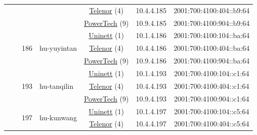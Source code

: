 \begin{small}
\begin{center}
\begin{longtable}{|c|c|c|c|c|c|c|c|}
  &  &  &  & \multicolumn{2}{|c|}{\tiny{\href{https://www.telenor.no}{Telenor} (4)}} & \tiny{10.4.4.185} & \tiny{2001:700:4100:404::b9:64} \\* \cline{5-5}\cline{6-6}\cline{7-7}\cline{8-8}
  &  &  &  & \multicolumn{2}{|c|}{\tiny{\href{http://www.powertech.no}{PowerTech} (9)}} & \tiny{10.9.4.185} & \tiny{2001:700:4100:904::b9:64} \\* \cline{3-3}\cline{4-4}\cline{5-5}\cline{6-6}\cline{7-7}\cline{8-8}
  &  & \multirow{3}{*}{\tiny{186}} & \multicolumn{1}{|l|}{\multirow{3}{*}{\tiny{hu-yuyintan}}} & \multicolumn{2}{|c|}{\tiny{\href{https://www.uninett.no}{Uninett} (1)}} & \tiny{10.1.4.186} & \tiny{2001:700:4100:104::ba:64} \\* \cline{5-5}\cline{6-6}\cline{7-7}\cline{8-8}
  &  &  &  & \multicolumn{2}{|c|}{\tiny{\href{https://www.telenor.no}{Telenor} (4)}} & \tiny{10.4.4.186} & \tiny{2001:700:4100:404::ba:64} \\* \cline{5-5}\cline{6-6}\cline{7-7}\cline{8-8}
  &  &  &  & \multicolumn{2}{|c|}{\tiny{\href{http://www.powertech.no}{PowerTech} (9)}} & \tiny{10.9.4.186} & \tiny{2001:700:4100:904::ba:64} \\* \cline{3-3}\cline{4-4}\cline{5-5}\cline{6-6}\cline{7-7}\cline{8-8}
  &  & \multirow{3}{*}{\tiny{193}} & \multicolumn{1}{|l|}{\multirow{3}{*}{\tiny{hu-tanqilin}}} & \multicolumn{2}{|c|}{\tiny{\href{https://www.uninett.no}{Uninett} (1)}} & \tiny{10.1.4.193} & \tiny{2001:700:4100:104::c1:64} \\* \cline{5-5}\cline{6-6}\cline{7-7}\cline{8-8}
  &  &  &  & \multicolumn{2}{|c|}{\tiny{\href{https://www.telenor.no}{Telenor} (4)}} & \tiny{10.4.4.193} & \tiny{2001:700:4100:404::c1:64} \\* \cline{5-5}\cline{6-6}\cline{7-7}\cline{8-8}
  &  &  &  & \multicolumn{2}{|c|}{\tiny{\href{http://www.powertech.no}{PowerTech} (9)}} & \tiny{10.9.4.193} & \tiny{2001:700:4100:904::c1:64} \\* \cline{3-3}\cline{4-4}\cline{5-5}\cline{6-6}\cline{7-7}\cline{8-8}
  &  & \multirow{3}{*}{\tiny{197}} & \multicolumn{1}{|l|}{\multirow{3}{*}{\tiny{hu-kunwang}}} & \multicolumn{2}{|c|}{\tiny{\href{https://www.uninett.no}{Uninett} (1)}} & \tiny{10.1.4.197} & \tiny{2001:700:4100:104::c5:64} \\* \cline{5-5}\cline{6-6}\cline{7-7}\cline{8-8}
  &  &  &  & \multicolumn{2}{|c|}{\tiny{\href{https://www.telenor.no}{Telenor} (4)}} & \tiny{10.4.4.197} & \tiny{2001:700:4100:404::c5:64} \\* \cline{5-5}\cline{6-6}\cline{7-7}\cline{8-8}

\end{longtable}
\end{center}
\end{small}
